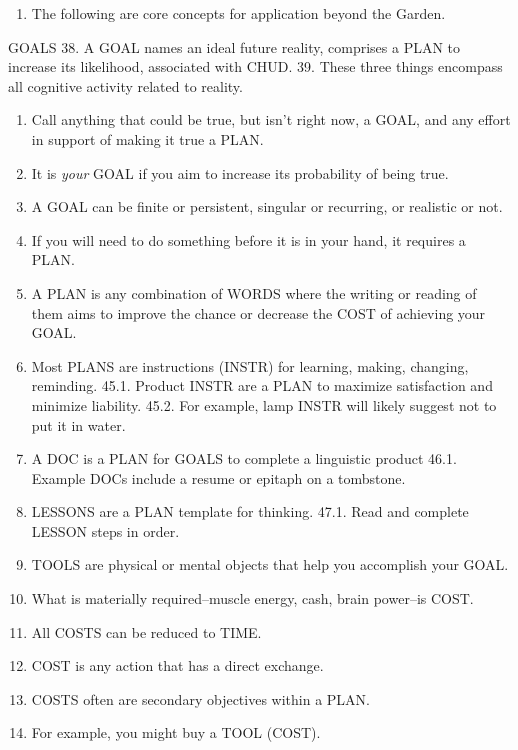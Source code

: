 \documentclass[
]{book}
\providecommand{\tightlist}{%
  \setlength{\itemsep}{0pt}\setlength{\parskip}{0pt}}
\begin{document}
\begin{enumerate}
\def\labelenumi{\arabic{enumi}.}
\setcounter{enumi}{36}
\tightlist
\item
  The following are core concepts for application beyond the Garden.
\end{enumerate}

GOALS
38. A GOAL names an ideal future reality, comprises a PLAN to increase its
likelihood, associated with CHUD.
39. These three things encompass all cognitive activity related to reality.

\begin{enumerate}
\def\labelenumi{\arabic{enumi}.}
\setcounter{enumi}{39}
\item
  Call anything that could be true, but isn't right now, a GOAL, and any effort in support of making it true a PLAN.
\item
  It is \emph{your} GOAL if you aim to increase its probability of being true.
\item
  A GOAL can be finite or persistent, singular or recurring, or realistic or not.
\item
  If you will need to do something before it is in your hand, it requires a PLAN.
\item
  A PLAN is any combination of WORDS where the writing or reading of them aims
  to improve the chance or decrease the COST of achieving your GOAL.
\item
  Most PLANS are instructions (INSTR) for learning, making, changing, reminding.
  45.1. Product INSTR are a PLAN to maximize satisfaction and minimize liability.
  45.2. For example, lamp INSTR will likely suggest not to put it in water.
\item
  A DOC is a PLAN for GOALS to complete a linguistic product
  46.1. Example DOCs include a resume or epitaph on a tombstone.
\item
  LESSONS are a PLAN template for thinking.
  47.1. Read and complete LESSON steps in order.
\item
  TOOLS are physical or mental objects that help you accomplish your GOAL.
\item
  What is materially required--muscle energy, cash, brain power--is COST.
\item
  All COSTS can be reduced to TIME.
\item
  COST is any action that has a direct exchange.
\item
  COSTS often are secondary objectives within a PLAN.
\item
  For example, you might buy a TOOL (COST).
\end{enumerate}
\end{document}

